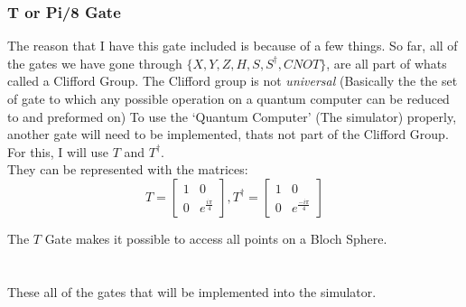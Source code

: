 \documentclass[../main.tex]{subfiles}
\begin{document}
\subsubsection{T or Pi/8 Gate}

The reason that I have this gate included is because of a few things. So
far, all of the gates we have gone through
\(\{ X,Y,Z,H,S,S^\dagger, CNOT \}\), are all part of whats called a
Clifford Group. The Clifford group is not \emph{universal} (Basically the the set of gate to which
any possible operation on a quantum computer can be reduced to and
preformed on)
To use the `Quantum Computer' (The simulator) properly, another gate will need to be implemented, thats not part of the Clifford Group. For this, I
will use \(T\) and \(T^\dagger\).\\
They can be represented with the matrices:\\
\begin{equation}
	T = \left[ \begin{matrix} 1 & 0\\0 & e^\frac{i\pi}{4}\end{matrix} \right], T^\dagger = \left[ \begin{matrix} 1 & 0\\0 & e^{\frac{-i\pi}{4}}\end{matrix} \right]
\end{equation}

The \(T\) Gate makes it possible to access all points on a Bloch
Sphere.\\ \\ \\
These all of the gates that will be implemented into the simulator.
\end{document}
